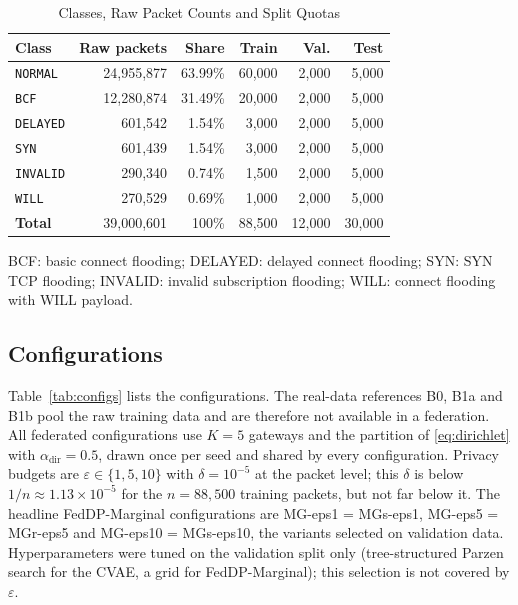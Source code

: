 \begin{table}[!t]
\centering
\caption{Classes, Raw Packet Counts and Split Quotas}
\label{tab:data}
\scriptsize
\setlength{\tabcolsep}{4pt}
\begin{tabular}{l r r r r r}
\toprule
\textbf{Class} & \textbf{Raw packets} & \textbf{Share} & \textbf{Train} & \textbf{Val.} & \textbf{Test} \\
\midrule
\texttt{NORMAL}  & 24,955,877 & 63.99\% & 60,000 & 2,000 & 5,000 \\
\texttt{BCF}     & 12,280,874 & 31.49\% & 20,000 & 2,000 & 5,000 \\
\texttt{DELAYED} &    601,542 &  1.54\% &  3,000 & 2,000 & 5,000 \\
\texttt{SYN}     &    601,439 &  1.54\% &  3,000 & 2,000 & 5,000 \\
\texttt{INVALID} &    290,340 &  0.74\% &  1,500 & 2,000 & 5,000 \\
\texttt{WILL}    &    270,529 &  0.69\% &  1,000 & 2,000 & 5,000 \\
\midrule
\textbf{Total}   & 39,000,601 & 100\%   & 88,500 & 12,000 & 30,000 \\
\bottomrule
\end{tabular}

\vspace{2pt}
\parbox{\columnwidth}{\scriptsize BCF: basic connect flooding; DELAYED: delayed connect flooding; SYN: SYN TCP flooding; INVALID: invalid subscription flooding; WILL: connect flooding with WILL payload.}
\end{table}

\subsection{Configurations}
Table~\ref{tab:configs} lists the configurations. The real-data references B0, B1a and B1b pool the raw training data and are therefore not available in a federation. All federated configurations use $K = 5$ gateways and the partition of \eqref{eq:dirichlet} with $\alpha_{\mathrm{dir}} = 0.5$, drawn once per seed and shared by every configuration. Privacy budgets are $\varepsilon \in \{1, 5, 10\}$ with $\delta = 10^{-5}$ at the packet level; this $\delta$ is below $1/n \approx 1.13 \times 10^{-5}$ for the $n = 88{,}500$ training packets, but not far below it. The headline FedDP-Marginal configurations are MG-eps1 = MGs-eps1, MG-eps5 = MGr-eps5 and MG-eps10 = MGs-eps10, the variants selected on validation data. Hyperparameters were tuned on the validation split only (tree-structured Parzen search for the CVAE, a grid for FedDP-Marginal); this selection is not covered by $\varepsilon$.

